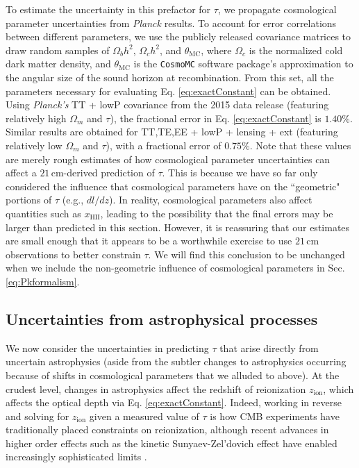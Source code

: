 \documentclass[twocolumn,aps,prd,nofootinbib,showpacs]{revtex4-1}
\begin{document}
To estimate the uncertainty in this prefactor for $\tau$, we propagate cosmological parameter uncertainties from \emph{Planck} results. To account for error correlations between different parameters, we use the publicly released covariance matrices to draw random samples of $\Omega_b h^2$, $\Omega_c h^2$, and $\theta_\textrm{MC}$, where $\Omega_c$ is the normalized cold dark matter density, and $\theta_\textrm{MC}$ is the {\tt CosmoMC} software package's \cite{lewis_and_bridle2002} approximation to the angular size of the sound horizon at recombination. From this set, all the parameters necessary for evaluating Eq. \eqref{eq:exactConstant} can be obtained. Using \emph{Planck's} TT + lowP covariance from the 2015 data release (featuring relatively high $\Omega_m$ and $\tau$), the fractional error in Eq. \eqref{eq:exactConstant} is $1.40\%$. Similar results are obtained for TT,TE,EE + lowP + lensing + ext (featuring relatively low $\Omega_m$ and $\tau$), with a fractional error of $0.75\%$. Note that these values are merely rough estimates of how cosmological parameter uncertainties can affect a $21\,\textrm{cm}$-derived prediction of $\tau$. This is because we have so far only considered the influence that cosmological parameters have on the ``geometric" portions of $\tau$ (e.g., $dl/dz$). In reality, cosmological parameters also affect quantities such as $x_\textrm{HII}$, leading to the possibility that the final errors may be larger than predicted in this section. However, it is reassuring that our estimates are small enough that it appears to be a worthwhile exercise to use $21\,\textrm{cm}$ observations to better constrain $\tau$. We will find this conclusion to be unchanged when we include the non-geometric influence of cosmological parameters in Sec. \ref{eq:Pkformalism}.



\subsection{Uncertainties from astrophysical processes}
\label{sec:astroUncertainties}

We now consider the uncertainties in predicting $\tau$ that arise directly from uncertain astrophysics (aside from the subtler changes to astrophysics occurring because of shifts in cosmological parameters that we alluded to above). At the crudest level, changes in astrophysics affect the redshift of reionization $z_\textrm{ion}$, which affects the optical depth via Eq. \eqref{eq:exactConstant}. Indeed, working in reverse and solving for $z_\textrm{ion}$ given a measured value of $\tau$ is how CMB experiments have traditionally placed constraints on reionization, although recent advances in higher order effects such as the kinetic Sunyaev-Zel'dovich effect have enabled increasingly sophisticated limits \cite{zahn_et_al2012,sievers_et_al2013,george_et_al2015}.
\end{document}
